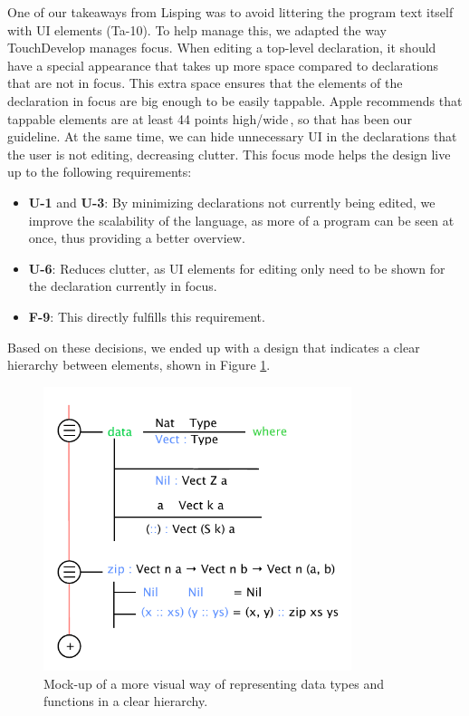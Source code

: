 
One of our takeaways from Lisping was to avoid littering the program text itself with UI elements
(Ta-10).
To help manage this, we adapted the way TouchDevelop manages focus.
When editing a top-level declaration, it should have a special appearance that takes up more space compared to declarations that are not in focus.
This extra space ensures that the elements of the declaration in focus are big enough to be easily tappable. 
Apple recommends that tappable elements are at least 44 points high/wide\,\cite{mobileHIG}, so that has
been our guideline.
At the same time, we can hide unnecessary UI in the declarations that the user is not editing, decreasing clutter.
This focus mode helps the design live up to the following requirements:
\begin{itemize}
	\item \textbf{U-1} and \textbf{U-3}: By minimizing declarations not currently being edited, we improve the scalability of the language, as more of a program can be seen at once, thus providing a better overview.
	\item \textbf{U-6}: Reduces clutter, as UI elements for editing only need to be shown for the declaration currently in focus.
	\item \textbf{F-9}: This directly fulfills this requirement.
\end{itemize}

Based on these decisions, we ended up with a design that indicates a clear hierarchy between elements, shown in Figure
\ref{fig:initial_mockup_design}.

\begin{figure}
	\centering
		\includegraphics[width=90mm]{diagrams/initial_mockup_design.pdf}
	\caption{Mock-up of a more visual way of representing data types and functions
	in a clear hierarchy.}
\label{fig:initial_mockup_design}
\end{figure}

